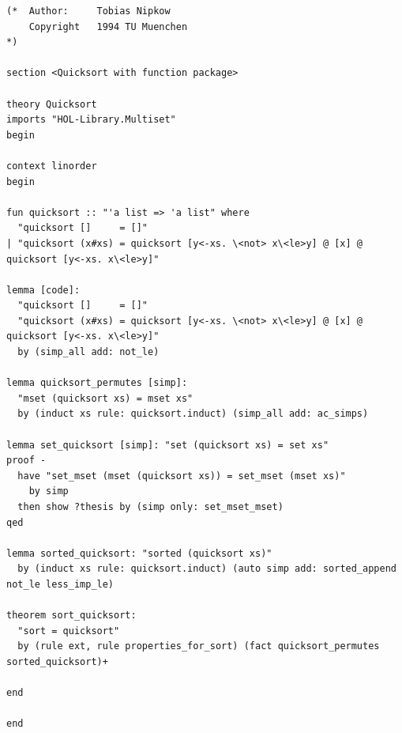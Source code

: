 \documentclass[a4paper]{article}
\begin{document}
\begin{lstlisting}[caption={Isabelle dokaz korektnosti algoritma quicksort}]
(*  Author:     Tobias Nipkow
    Copyright   1994 TU Muenchen
*)

section <Quicksort with function package>

theory Quicksort
imports "HOL-Library.Multiset"
begin

context linorder
begin

fun quicksort :: "'a list => 'a list" where
  "quicksort []     = []"
| "quicksort (x#xs) = quicksort [y<-xs. \<not> x\<le>y] @ [x] @ quicksort [y<-xs. x\<le>y]"

lemma [code]:
  "quicksort []     = []"
  "quicksort (x#xs) = quicksort [y<-xs. \<not> x\<le>y] @ [x] @ quicksort [y<-xs. x\<le>y]"
  by (simp_all add: not_le)

lemma quicksort_permutes [simp]:
  "mset (quicksort xs) = mset xs"
  by (induct xs rule: quicksort.induct) (simp_all add: ac_simps)

lemma set_quicksort [simp]: "set (quicksort xs) = set xs"
proof -
  have "set_mset (mset (quicksort xs)) = set_mset (mset xs)"
    by simp
  then show ?thesis by (simp only: set_mset_mset)
qed

lemma sorted_quicksort: "sorted (quicksort xs)"
  by (induct xs rule: quicksort.induct) (auto simp add: sorted_append not_le less_imp_le)

theorem sort_quicksort:
  "sort = quicksort"
  by (rule ext, rule properties_for_sort) (fact quicksort_permutes sorted_quicksort)+

end

end
\end{lstlisting}
\end{document}
